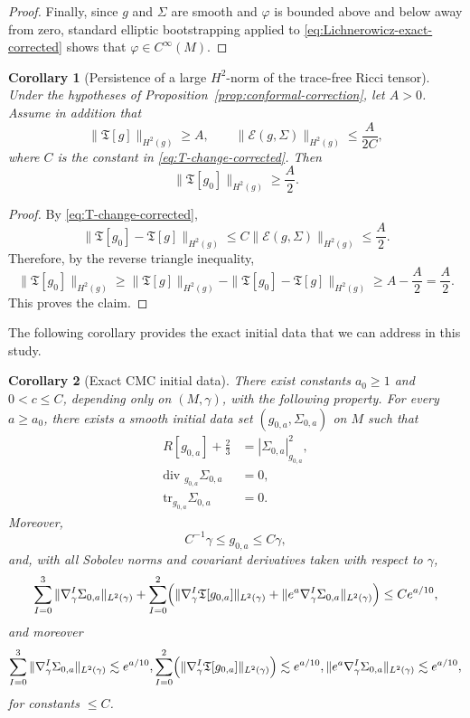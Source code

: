 \documentclass{amsart}
\newtheorem{corollary}{Corollary}[section]
\renewcommand{\div}{\mbox{div }}
\newcommand{\tr}{\mbox{tr}}
\begin{document}
\begin{proof}
\noindent Finally, since \(g\) and \(\Sigma\) are smooth and \(\varphi\) is bounded above and below
away from zero, standard elliptic bootstrapping applied to
\eqref{eq:Lichnerowicz-exact-corrected} shows that \(\varphi\in C^{\infty}(M)\).
\end{proof}
\begin{corollary}[Persistence of a large \(H^{2}\)-norm of the trace-free Ricci tensor]
\label{cor:persistence}
Under the hypotheses of Proposition~\ref{prop:conformal-correction}, let \(A>0\). Assume in addition that
\[
\|\mathfrak T[g]\|_{H^{2}(g)}\ge A,
\qquad
\|\mathcal E(g,\Sigma)\|_{H^{2}(g)}\le \frac{A}{2C},
\]
where \(C\) is the constant in \eqref{eq:T-change-corrected}. Then
\[
\|\mathfrak T[g_{0}]\|_{H^{2}(g)}\ge \frac{A}{2}.
\]
\end{corollary}

\begin{proof}
By \eqref{eq:T-change-corrected},
\[
\|\mathfrak T[g_{0}]-\mathfrak T[g]\|_{H^{2}(g)}
\le
C\|\mathcal E(g,\Sigma)\|_{H^{2}(g)}
\le
\frac{A}{2}.
\]
Therefore, by the reverse triangle inequality,
\[
\|\mathfrak T[g_{0}]\|_{H^{2}(g)}
\ge
\|\mathfrak T[g]\|_{H^{2}(g)}
-
\|\mathfrak T[g_{0}]-\mathfrak T[g]\|_{H^{2}(g)}
\ge
A-\frac{A}{2}
=
\frac{A}{2}.
\]
This proves the claim.
\end{proof}
\noindent The following corollary provides the exact initial data that we can address in this study.
\begin{corollary}[Exact CMC initial data]
\label{cor:final-CMC}
There exist constants \(a_{0}\ge 1\) and \(0<c\le C\), depending only on \((M,\gamma)\), with the following property. For every \(a\ge a_{0}\), there exists a smooth initial data set \((g_{0,a},\Sigma_{0,a})\) on \(M\) such that
\begin{align}
R[g_{0,a}]+\frac23&=|\Sigma_{0,a}|_{g_{0,a}}^{2},\\
\div_{g_{0,a}}\Sigma_{0,a}&=0,\\
\tr_{g_{0,a}}\Sigma_{0,a}&=0.
\end{align}
Moreover,
\begin{equation}
\label{eq:g0a-gamma-equivalence}
C^{-1}\gamma\le g_{0,a}\le C\gamma,
\end{equation}
and, with all Sobolev norms and covariant derivatives taken with respect to \(\gamma\),
\begin{equation}
\label{eq:final-CMC-upper}
\sum_{I=0}^{3}\|\nabla_\gamma^{I}\Sigma_{0,a}\|_{L^{2}(\gamma)}
+\sum_{I=0}^{2}\Bigl(
\|\nabla_\gamma^{I}\mathfrak T[g_{0,a}]\|_{L^{2}(\gamma)}
+
\|e^{a}\nabla_\gamma^{I}\Sigma_{0,a}\|_{L^{2}(\gamma)}
\Bigr)
\le C e^{a/10},
\end{equation}
and moreover
\begin{equation}
\label{eq:final-CMC-lower}
\sum_{I=0}^{3}\|\nabla_\gamma^{I}\Sigma_{0,a}\|_{L^{2}(\gamma)}\lesssim e^{a/10},\sum_{I=0}^{2}\Bigl(
\|\nabla_\gamma^{I}\mathfrak T[g_{0,a}]\|_{L^{2}(\gamma)}
\Bigr)
\lesssim e^{a/10}, 
\|e^{a}\nabla_\gamma^{I}\Sigma_{0,a}\|_{L^{2}(\gamma)}\lesssim e^{a/10},
\end{equation}
for constants $\leq C$.
\end{corollary}
\end{document}
